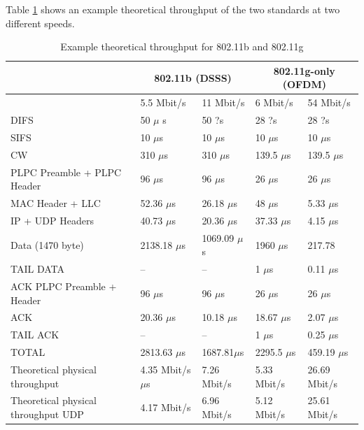 	Table \ref{tbl:80211bgexample} shows an example theoretical throughput of the two standards at two different speeds.
	
	\begin{table}[h!]
		\begin{tabularx}{15cm}{ | X | X | X | X | X | }
			\hline
				 & \multicolumn{2}{|c|}{ 802.11b (DSSS)} & \multicolumn{2}{|c|}{ 802.11g-only (OFDM)} \\
				 \hline
				 & 5.5 Mbit/s & 11 Mbit/s & 6 Mbit/s & 54 Mbit/s \\
			\hline
				DIFS & 50 $\mu$ s & 50 ?s & 28 ?s & 28 ?s \\
			\hline
				SIFS & 10 $\mu$s & 10 $\mu$s & 10 $\mu$s & 10 $\mu$s \\
			\hline
				CW & 310 $\mu$s & 310 $\mu$s & 139.5 $\mu$s & 139.5 $\mu$s \\
			\hline
				PLPC Preamble + PLPC Header & 96 $\mu$s & 96 $\mu$s & 26 $\mu$s & 26 $\mu$s \\
			\hline
				MAC Header + LLC & 52.36 $\mu$s & 26.18 $\mu$s & 48 $\mu$s & 5.33 $\mu$s \\
			\hline
				IP + UDP Headers & 40.73 $\mu$s & 20.36 $\mu$s & 37.33 $\mu$s & 4.15 $\mu$s \\
			\hline
				Data (1470 byte)& 2138.18 $\mu$s & 1069.09 $\mu$s & 1960 $\mu$s & 217.78 \\
			\hline
				TAIL DATA & -- & -- & 1 $\mu$s & 0.11 $\mu$s \\
			\hline
				ACK PLPC Preamble + Header & 96 $\mu$s & 96 $\mu$s & 26 $\mu$s & 26 $\mu$s \\
			\hline
				ACK & 20.36 $\mu$s & 10.18 $\mu$s & 18.67 $\mu$s & 2.07 $\mu$s \\
			\hline
				TAIL ACK & -- & -- & 1 $\mu$s & 0.25 $\mu$s \\
			\hline
			\hline
				TOTAL & 2813.63 $\mu$s & 1687.81$\mu$s & 2295.5 $\mu$s & 459.19 $\mu$s \\
			\hline
			\hline
				Theoretical physical throughput & 4.35 Mbit/s $\mu$s & 7.26 Mbit/s & 5.33 Mbit/s & 26.69 Mbit/s \\
			\hline
			\hline
				Theoretical physical throughput UDP & 4.17 Mbit/s & 6.96 Mbit/s & 5.12 Mbit/s & 25.61 Mbit/s \\
			\hline
			
		\end{tabularx}
		\caption{Example theoretical throughput for 802.11b and 802.11g}
		\label{tbl:80211bgexample}
	\end{table}
	
